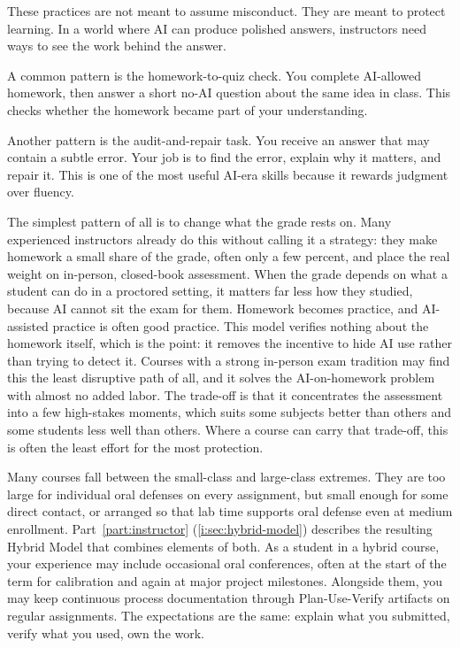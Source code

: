 \documentclass{SIAMbook2023}
\begin{document}
These practices are not meant to assume misconduct. They are meant to protect learning. In a world where AI can produce polished answers, instructors need ways to see the work behind the answer.

A common pattern is the homework-to-quiz check. You complete AI-allowed homework, then answer a short no-AI question about the same idea in class. This checks whether the homework became part of your understanding.

Another pattern is the audit-and-repair task. You receive an answer that may contain a subtle error. Your job is to find the error, explain why it matters, and repair it. This is one of the most useful AI-era skills because it rewards judgment over fluency.

The simplest pattern of all is to change what the grade rests on. Many experienced instructors already do this without calling it a strategy: they make homework a small share of the grade, often only a few percent, and place the real weight on in-person, closed-book assessment. When the grade depends on what a student can do in a proctored setting, it matters far less how they studied, because AI cannot sit the exam for them. Homework becomes practice, and AI-assisted practice is often good practice. This model verifies nothing about the homework itself, which is the point: it removes the incentive to hide AI use rather than trying to detect it. Courses with a strong in-person exam tradition may find this the least disruptive path of all, and it solves the AI-on-homework problem with almost no added labor. The trade-off is that it concentrates the assessment into a few high-stakes moments, which suits some subjects better than others and some students less well than others. Where a course can carry that trade-off, this is often the least effort for the most protection.

Many courses fall between the small-class and large-class extremes. They are too large for individual oral defenses on every assignment, but small enough for some direct contact, or arranged so that lab time supports oral defense even at medium enrollment. Part~\ref{part:instructor} (\cref{i:sec:hybrid-model}) describes the resulting Hybrid Model that combines elements of both. As a student in a hybrid course, your experience may include occasional oral conferences, often at the start of the term for calibration and again at major project milestones. Alongside them, you may keep continuous process documentation through Plan-Use-Verify artifacts on regular assignments. The expectations are the same: explain what you submitted, verify what you used, own the work.
\end{document}
